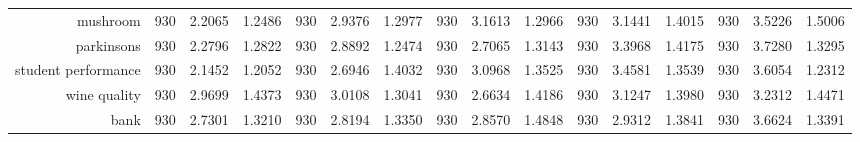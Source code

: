 \begin{table}[htbp]
{\begin{tabular}{rccccccccccccccc}
			mushroom                            & 930                                  & \cellcolor[rgb]{ .776,  .937,  .808}\textcolor[rgb]{ 0,  .38,  0}{2.2065}          & 1.2486          & 930            & 2.9376                                                                    & 1.2977          & 930            & 3.1613                                                                    & 1.2966          & 930            & 3.1441                                                                    & 1.4015          & 930            & 3.5226          & 1.5006          \\
			parkinsons                          & 930                                  & \cellcolor[rgb]{ .776,  .937,  .808}\textcolor[rgb]{ 0,  .38,  0}{2.2796}          & 1.2822          & 930            & 2.8892                                                                    & 1.2474          & 930            & 2.7065                                                                    & 1.3143          & 930            & 3.3968                                                                    & 1.4175          & 930            & 3.7280          & 1.3295          \\
			student performance                 & 930                                  & \cellcolor[rgb]{ .776,  .937,  .808}\textcolor[rgb]{ 0,  .38,  0}{2.1452}          & 1.2052          & 930            & 2.6946                                                                    & 1.4032          & 930            & 3.0968                                                                    & 1.3525          & 930            & 3.4581                                                                    & 1.3539          & 930            & 3.6054          & 1.2312          \\
			wine quality                        & 930                                  & 2.9699                                                                             & 1.4373          & 930            & 3.0108                                                                    & 1.3041          & 930            & \cellcolor[rgb]{ .776,  .937,  .808}\textcolor[rgb]{ 0,  .38,  0}{2.6634} & 1.4186          & 930            & 3.1247                                                                    & 1.3980          & 930            & 3.2312          & 1.4471          \\
			bank                                & 930                                  & 2.7301                                                                             & 1.3210          & 930            & 2.8194                                                                    & 1.3350          & 930            & 2.8570                                                                    & 1.4848          & 930            & 2.9312                                                                    & 1.3841          & 930            & 3.6624          & 1.3391          \\

\end{tabular}}
\end{table}
